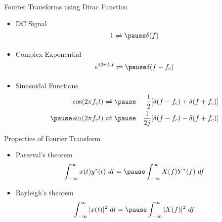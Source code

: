 \documentclass[t]{beamer}
\begin{document}
\begin{frame}{Fourier Transforms using Dirac Function}
  \begin{itemize}
    \item DC Signal
      \begin{equation*}
        1 \xrightleftharpoons{} \pause \delta(f)
      \end{equation*}
    \pause
    \item Complex Exponential
      \begin{equation*}
        e^{j2\pi f_ct} \xrightleftharpoons{} \pause \delta(f-f_c)
      \end{equation*}
    \pause
    \item Sinusoidal Functions
      \begin{eqnarray*}
      \cos(2\pi f_c t) & \xrightleftharpoons{} \pause & \frac{1}{2}[\delta(f-f_c) + \delta(f+f_c)]\\
      \pause
      \sin(2\pi f_c t) & \xrightleftharpoons{} \pause & \frac{1}{2j}[\delta(f-f_c) - \delta(f+f_c)]
      \end{eqnarray*}
  \end{itemize}
\end{frame}

\begin{frame}{Properties of Fourier Transform}
  \begin{itemize}
    \item Parseval's theorem
      \begin{equation*}
        \int_{-\infty}^{\infty} x(t)y^*(t) \ dt = \pause \int_{-\infty}^{\infty} X(f)Y^*(f)\ df
      \end{equation*}
    \pause
    \item Rayleigh's theorem
      \begin{equation*}
        \int_{-\infty}^{\infty} |x(t)|^2\ dt = \pause \int_{-\infty}^{\infty} |X(f)|^2\ df
      \end{equation*}
  \end{itemize}
\end{frame}
\end{document}
